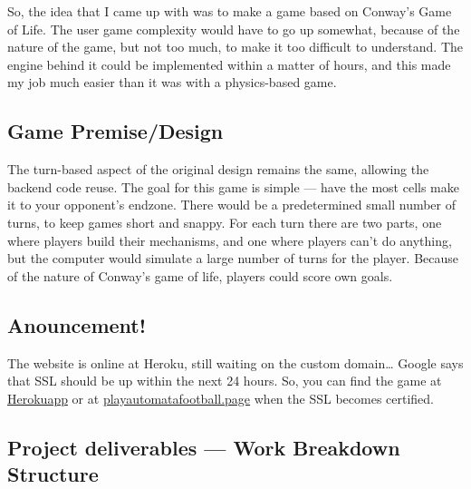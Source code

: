 \documentclass[11pt]{article}
\begin{document}
So, the idea that I came up with was to make a game based on Conway's Game of Life. The user game complexity would
have to go up somewhat, because of the nature of the game, but not too much, to make it too difficult to understand.
The engine behind it could be implemented within a matter of hours, and this made my job much easier than it was with
a physics-based game.

\subsection{Game Premise/Design}
\label{sec:org0202cae}
The turn-based aspect of the original design remains the same, allowing the backend code reuse. The goal for this game
is simple --- have the most cells make it to your opponent's endzone. There would be a predetermined small number of
turns, to keep games short and snappy. For each turn there are two parts, one where players build their mechanisms,
and one where players can't do anything, but the computer would simulate a large number of turns for the player.
Because of the nature of Conway's game of life, players could score own goals.

\subsection{Anouncement!}
\label{sec:org6fa99d0}
The website is online at Heroku, still waiting on the custom domain\dots{} Google says that SSL should be up within
the next 24 hours. So, you can find the game at \href{https://automata-football.herokuapp.com/}{Herokuapp} or at \href{https://www.playautomatafootball.page}{playautomatafootball.page} when the SSL becomes
certified.
\subsection{Project deliverables --- Work Breakdown Structure}
\label{sec:orgacaa491}
\end{document}

